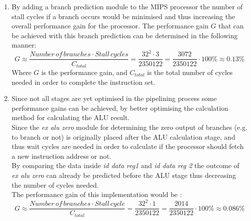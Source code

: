 \documentclass[10pt]{article}
\begin{document}
\begin{enumerate}

\item By adding a branch prediction module to the MIPS processor the number of stall cycles if a branch occurs would be minimised and thus increasing the overall performance gain for the processor. The performance gain $G$ that can be achieved with this branch prediction can be determined in the following manner:
\begin{equation}
  G \approx  \frac{Number \, of \, branches \cdot Stall \, cycles }{ C_{total}} = \frac{32^2 \cdot 3}{ 2350122} = \frac{3072}{2350122} \cdot 100\% \approx 0.13 \%
\end{equation}
Where $G$ is the performance gain, and $C_{total} $ is the total number of cycles needed in order to complete the instruction set.\\




\item Since not all stages are yet optimised in the pipelining process some performance gains can be achieved, by better optimising the calculation method for calculating the ALU result.\\
Since the \textit{ex alu zero} module for determining the zero output of branches (e.g. to branch or not) is originally placed after the ALU calculation stage, and thus wait cycles are needed in order to calculate if the processor should fetch a new instruction address or not. \\ By comparing the data inside \textit{id data reg1} and \textit{id data reg 2} the outcome of \textit{ex alu zero} can already be predicted before the ALU stage thus decreasing the number of cycles needed.\\
The performance gain of this implementation would be :
\begin{equation}
    G \approx \frac{Number \, of \, branches \cdot Stall \, cycle}{C_{total}} = \frac{32^2 \cdot 1 }{2350122 } = \frac{2014}{2350122} \cdot 100\% \approx 0.086 \%
\end{equation}


\end{enumerate}
\end{document}
